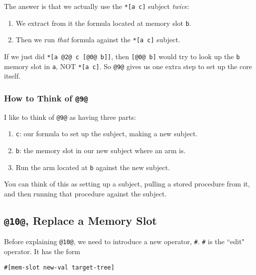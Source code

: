 \documentclass[twoside]{article}
\begin{document}
The answer is that we actually use the \lstinline[style=inlinecode]{*[a c]} subject \emph{twice}:

\begin{enumerate}
  \item  We extract from it the formula located at memory slot \lstinline[style=inlinecode]{b}.
  \item  Then we run \emph{that} formula against the \lstinline[style=inlinecode]{*[a c]} subject.
\end{enumerate}

If we just did \lstinline[style=inlinecode]{*[a @2@ c [@0@ b]]}, then \lstinline[style=inlinecode]{[@0@ b]} would try to look up the \lstinline[style=inlinecode]{b} memory slot in \lstinline[style=inlinecode]{a}, NOT \lstinline[style=inlinecode]{*[a c]}. So \lstinline[style=inlinecode]{@9@} gives us one extra step to set up the core itself.

\subsubsection{How to Think of \lstinline[style=inlinecode]{@9@}}

I like to think of \lstinline[style=inlinecode]{@9@} as having three parts:

\begin{enumerate}
  \item  \lstinline[style=inlinecode]{c}: our formula to set up the subject, making a new subject.
  \item  \lstinline[style=inlinecode]{b}: the memory slot in our new subject where an arm is.
  \item  Run the arm located at \lstinline[style=inlinecode]{b} against the new subject.
\end{enumerate}

\noindent{}
You can think of this as setting up a subject, pulling a stored procedure from it, and then running that procedure against the subject.

\subsection{\lstinline[style=inlinecode]{@10@}, Replace a Memory Slot}

Before explaining \lstinline[style=inlinecode]{@10@}, we need to introduce a new operator, \lstinline[style=inlinecode]{#}. \lstinline[style=inlinecode]{#} is the ``edit" operator. It has the form

\begin{lstlisting}[style=listingcode]
#[mem-slot new-val target-tree]
\end{lstlisting}
\end{document}

